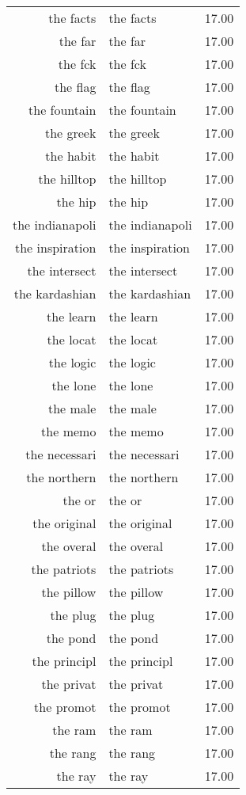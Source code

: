 \begin{table}[ht]
\begin{tabular}{rlr}
  the facts & the facts & 17.00 \\ 
  the far & the far & 17.00 \\ 
  the fck & the fck & 17.00 \\ 
  the flag & the flag & 17.00 \\ 
  the fountain & the fountain & 17.00 \\ 
  the greek & the greek & 17.00 \\ 
  the habit & the habit & 17.00 \\ 
  the hilltop & the hilltop & 17.00 \\ 
  the hip & the hip & 17.00 \\ 
  the indianapoli & the indianapoli & 17.00 \\ 
  the inspiration & the inspiration & 17.00 \\ 
  the intersect & the intersect & 17.00 \\ 
  the kardashian & the kardashian & 17.00 \\ 
  the learn & the learn & 17.00 \\ 
  the locat & the locat & 17.00 \\ 
  the logic & the logic & 17.00 \\ 
  the lone & the lone & 17.00 \\ 
  the male & the male & 17.00 \\ 
  the memo & the memo & 17.00 \\ 
  the necessari & the necessari & 17.00 \\ 
  the northern & the northern & 17.00 \\ 
  the or & the or & 17.00 \\ 
  the original & the original & 17.00 \\ 
  the overal & the overal & 17.00 \\ 
  the patriots & the patriots & 17.00 \\ 
  the pillow & the pillow & 17.00 \\ 
  the plug & the plug & 17.00 \\ 
  the pond & the pond & 17.00 \\ 
  the principl & the principl & 17.00 \\ 
  the privat & the privat & 17.00 \\ 
  the promot & the promot & 17.00 \\ 
  the ram & the ram & 17.00 \\ 
  the rang & the rang & 17.00 \\ 
  the ray & the ray & 17.00 \\ 

\end{tabular}
\end{table}

